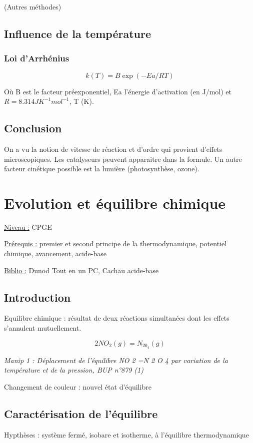 \documentclass{article}%
\begin{document}
(Autres méthodes)

\subsection{Influence de la température}
\subsubsection{Loi d'Arrhénius}

\[k(T)=B \exp (-Ea/RT)\]

Où B est le facteur préexponentiel, Ea l'énergie d'activation (en J/mol) et $R=8.314 JK^{-1}mol^{-1}$, T (K).

\subsection{Conclusion}

On a vu la notion de vitesse de réaction et d'ordre qui provient d'effets microscopiques. Les catalyseurs peuvent apparaitre dans la formule. Un autre facteur cinétique possible est la lumière (photosynthèse, ozone).

\section{Evolution et équilibre chimique}
\underline{Niveau :} CPGE 

\underline{Prérequis :} premier et second principe de la thermodynamique, potentiel chimique, avancement, acide-base

\underline{Biblio :} Dunod Tout en un PC, Cachau acide-base

\subsection{Introduction}

Equilibre chimique : résultat de deux réactions simultanées dont les effets s'annulent mutuellement.

\[2NO_2(g)=N_20_4(g)\]

\textit{Manip 1 : Déplacement de l’équilibre NO 2 =N 2 O 4 par variation de la température et de la pression, BUP n°879 (1)}

Changement de couleur : nouvel état d'équilibre
\subsection{Caractérisation de l’équilibre}
Hypthèses : système fermé, isobare et isotherme, à l'équilibre thermodynamique
\end{document}
